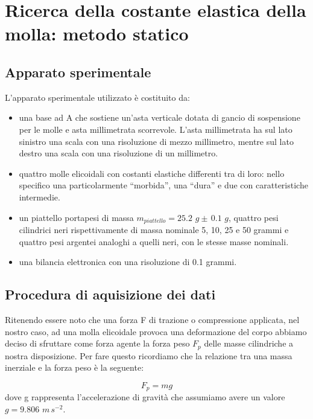 \section{Ricerca della costante elastica della molla: metodo statico}

\subsection{Apparato sperimentale}
L'apparato sperimentale utilizzato è costituito da:
	\begin{itemize}
		\item{una base ad A che sostiene un'asta verticale dotata di gancio di sospensione
            per le molle e asta millimetrata scorrevole. L'asta millimetrata ha sul lato sinistro
            una scala con una risoluzione di mezzo millimetro, mentre sul lato destro una scala con
            una risoluzione di un millimetro.}
		\item{quattro molle elicoidali con costanti elastiche differenti tra di loro: nello specifico
            una particolarmente ``morbida'', una ``dura'' e due con caratteristiche intermedie.}
		\item{un piattello portapesi di massa $m_{piattello} = 25.2\,\,g \pm\, 0.1\,\,g$, quattro pesi
            cilindrici neri rispettivamente di massa nominale 5, 10, 25 e 50 grammi e quattro pesi argentei
            analoghi a quelli neri, con le stesse masse nominali.}
        \item{una bilancia elettronica con una risoluzione di 0.1 grammi.}
	\end{itemize}

\subsection{Procedura di aquisizione dei dati}

Ritenendo essere noto che una forza F di trazione o compressione applicata, nel nostro caso, ad una molla elicoidale provoca una deformazione del corpo abbiamo deciso di sfruttare come forza agente la forza peso $F_{p}$ delle masse cilindriche a nostra disposizione. Per fare questo ricordiamo che la relazione tra una massa inerziale e la forza peso è la seguente:

\begin{equation}
	F_{p} = mg
\end{equation}
%
dove g rappresenta l'accelerazione di gravità che assumiamo avere un valore $g = 9.806\,\,m\,s^{-2}$.

